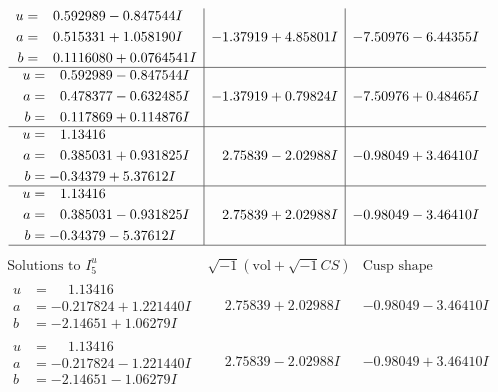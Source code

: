 \documentclass[1p]{elsarticle_modified}
\theoremstyle{definition}
\newcommand{\I}{\sqrt{-1}}
\begin{document}
$$\begin{array}{c|c|c}
\begin{aligned}
u &= \phantom{-}0.592989 - 0.847544 I \\
a &= \phantom{-}0.515331 + 1.058190 I \\
b &= \phantom{-}0.1116080 + 0.0764541 I\end{aligned}
 & -1.37919 + 4.85801 I & -7.50976 - 6.44355 I \\ \hline\begin{aligned}
u &= \phantom{-}0.592989 - 0.847544 I \\
a &= \phantom{-}0.478377 - 0.632485 I \\
b &= \phantom{-}0.117869 + 0.114876 I\end{aligned}
 & -1.37919 + 0.79824 I & -7.50976 + 0.48465 I \\ \hline\begin{aligned}
u &= \phantom{-}1.13416\phantom{ +0.000000I} \\
a &= \phantom{-}0.385031 + 0.931825 I \\
b &= -0.34379 + 5.37612 I\end{aligned}
 & \phantom{-}2.75839 - 2.02988 I & -0.98049 + 3.46410 I \\ \hline\begin{aligned}
u &= \phantom{-}1.13416\phantom{ +0.000000I} \\
a &= \phantom{-}0.385031 - 0.931825 I \\
b &= -0.34379 - 5.37612 I\end{aligned}
 & \phantom{-}2.75839 + 2.02988 I & -0.98049 - 3.46410 I\\
 \hline 
 \end{array}$$\newpage$$\begin{array}{c|c|c}  
\text{Solutions to }I^u_{5}& \I (\text{vol} + \sqrt{-1}CS) & \text{Cusp shape}\\
 \hline 
\begin{aligned}
u &= \phantom{-}1.13416\phantom{ +0.000000I} \\
a &= -0.217824 + 1.221440 I \\
b &= -2.14651 + 1.06279 I\end{aligned}
 & \phantom{-}2.75839 + 2.02988 I & -0.98049 - 3.46410 I \\ \hline\begin{aligned}
u &= \phantom{-}1.13416\phantom{ +0.000000I} \\
a &= -0.217824 - 1.221440 I \\
b &= -2.14651 - 1.06279 I\end{aligned}
 & \phantom{-}2.75839 - 2.02988 I & -0.98049 + 3.46410 I \\ \hline\begin{aligned}

\end{aligned}
\end{array}$$
\end{document}

